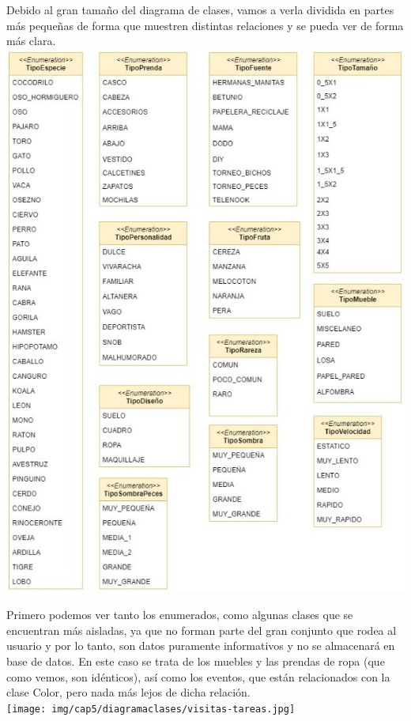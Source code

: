	Debido al gran tamaño del diagrama de clases, vamos a verla dividida en partes más pequeñas de forma que muestren distintas relaciones y se pueda ver de forma más clara.\\
	
	
	\includegraphics[width=\textwidth]{img/cap5/diagramaclases/enums.jpg}
	
	Primero podemos ver tanto los enumerados, como algunas clases que se encuentran más aisladas, ya que no forman parte del gran conjunto que rodea al usuario y por lo tanto, son datos puramente informativos y no se almacenará en base de datos. En este caso se trata de los muebles y las prendas de ropa (que como vemos, son idénticos), así como los eventos, que están relacionados con la clase Color, pero nada más lejos de dicha relación.\\ 
	
	\texttt{[image: img/cap5/diagramaclases/visitas-tareas.jpg]}
	
